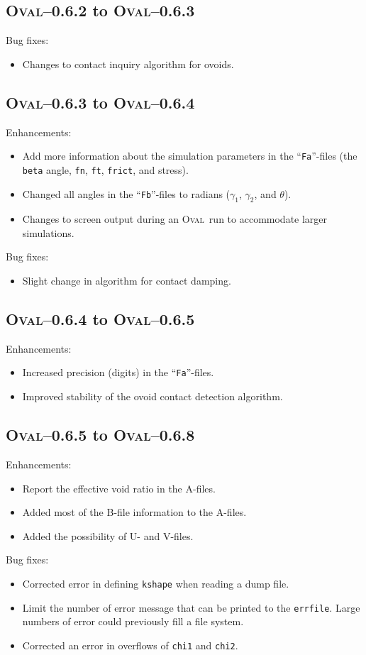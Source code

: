 \documentclass[letterpaper,11pt]{article}
\newcommand{\Oval}{\textsc{Oval}}
\begin{document}
\subsection{\Oval--0.6.2 to \Oval--0.6.3}\label{sec:oval062_to_oval063}
Bug fixes:
\begin{itemize}
\item
Changes to contact inquiry algorithm for ovoids.
\end{itemize}
%
\subsection{\Oval--0.6.3 to \Oval--0.6.4}\label{sec:oval063_to_oval064}
Enhancements:
\begin{itemize}
\item
Add more information about the simulation parameters in the 
``\texttt{Fa}''-files (the \texttt{beta} angle, \texttt{fn},
\texttt{ft}, \texttt{frict}, and stress).
\item
Changed all angles in the ``\texttt{Fb}''-files to radians 
($\gamma_{1}$, $\gamma_{2}$, and $\theta$).
\item
Changes to screen output during an \Oval\ run to accommodate larger simulations.
\end{itemize}
Bug fixes:
\begin{itemize}
\item
Slight change in algorithm for contact damping.
\end{itemize}
%
\subsection{\Oval--0.6.4 to \Oval--0.6.5}\label{sec:oval064_to_oval065}
Enhancements:
\begin{itemize}
\item
Increased precision (digits) in the ``\texttt{Fa}''-files.
\item
Improved stability of the ovoid contact detection algorithm.
\end{itemize}
%
%
\subsection{\Oval--0.6.5 to \Oval--0.6.8}\label{sec:oval065_to_oval068}
Enhancements:
\begin{itemize}
\item
Report the effective void ratio in the A-files.
\item
Added most of the B-file information to the A-files.
\item
Added the possibility of U- and V-files.
\end{itemize}
Bug fixes:
\begin{itemize}
\item
Corrected error in defining \texttt{kshape} when reading a dump file.
\item
Limit the number of error message that can be printed to the \texttt{errfile}.
Large numbers of error could previously fill a file system.
\item
Corrected an error in overflows of \texttt{chi1} and \texttt{chi2}.
\end{itemize}
%
%
\end{document}
